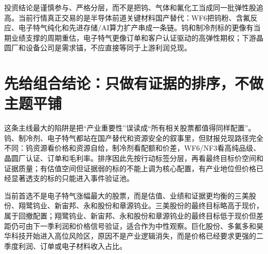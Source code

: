         \begin{keyinsight}[投资委员会结论]
        投资结论是谨慎参与、严格分层，而不是把钨、气体和氟化工当成同一批弹性股追高。当前行情真正交易的是半导体前道关键材料国产替代：WF6把钨粉、含氟反应、电子特气纯化和先进存储/AI算力扩产串成一条链。钨和制冷剂标的更像有当期业绩支撑的周期重估，电子特气更像订单和客户认证驱动的高弹性期权；下游晶圆厂和设备公司是需求锚，不应直接等同于上游利润兑现。
        \end{keyinsight}

        \section{先给组合结论：只做有证据的排序，不做主题平铺}
        这条主线最大的陷阱是把“产业重要性”误读成“所有相关股票都值得同样配置”。钨、制冷剂、电子特气都站在国产替代和资源安全的叙事里，但财报兑现路径完全不同：钨资源看价格和资源自给，制冷剂看配额和价差，WF6/NF3看高纯品级、晶圆厂认证、订单和毛利率。排序因此先按行动标签分层，再看最终目标价空间和证据质量；有估值空间但证据弱的标的不能上调为核心配置，有产业地位但价格已经显著透支的标的只能进入事件验证池。

        当前首选不是电子特气涨幅最大的股票，而是估值、业绩和证据更均衡的三美股份、翔鹭钨业、新宙邦、永和股份和章源钨业。三美股份的最终目标略高于现价，属于回撤配置；翔鹭钨业、新宙邦、永和股份和章源钨业的最终目标低于现价但差距仍可由下一季利润和价格信号验证，适合作为中性观察。巨化股份、多氟多和昊华科技开始进入高位风险区，原因不是产业逻辑消失，而是价格已经要求更强的二季度利润、订单或电子材料收入占比。

